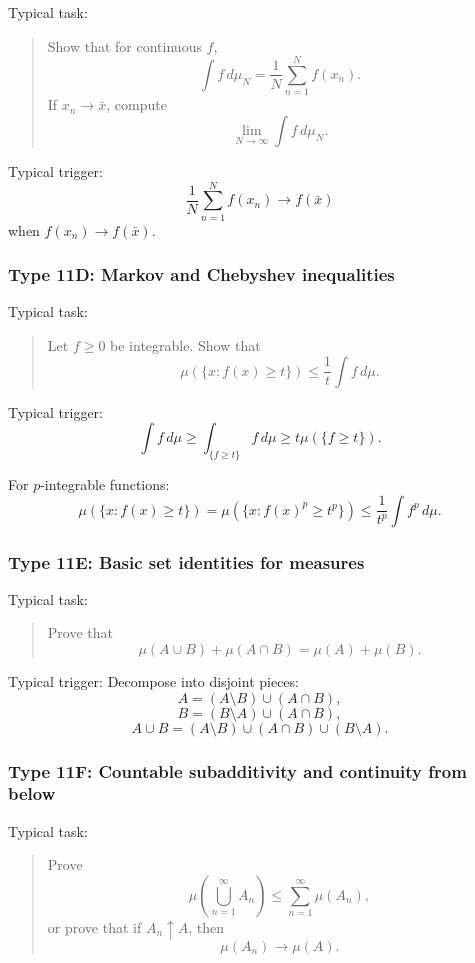 Typical task:
\begin{quote}
    Show that for continuous $f$,
    \[
        \int f\,d\mu_N
        =
        \frac1N\sum_{n=1}^N f(x_n).
    \]
    If $x_n\to \bar x$, compute
    \[
        \lim_{N\to\infty}\int f\,d\mu_N.
    \]
\end{quote}

Typical trigger:
\[
    \frac1N\sum_{n=1}^N f(x_n)\to f(\bar x)
\]
when $f(x_n)\to f(\bar x)$.

\subsubsection*{Type 11D: Markov and Chebyshev inequalities}

Typical task:
\begin{quote}
    Let $f\geq 0$ be integrable. Show that
    \[
        \mu(\{x:f(x)\geq t\})
        \leq
        \frac1t\int f\,d\mu.
    \]
\end{quote}

Typical trigger:
\[
    \int f\,d\mu
    \geq
    \int_{\{f\geq t\}} f\,d\mu
    \geq
    t\mu(\{f\geq t\}).
\]

For $p$-integrable functions:
\[
    \mu(\{x:f(x)\geq t\})
    =
    \mu(\{x:f(x)^p\geq t^p\})
    \leq
    \frac1{t^p}\int f^p\,d\mu.
\]

\subsubsection*{Type 11E: Basic set identities for measures}

Typical task:
\begin{quote}
    Prove that
    \[
        \mu(A\cup B)+\mu(A\cap B)=\mu(A)+\mu(B).
    \]
\end{quote}

Typical trigger: Decompose into disjoint pieces:
\[
    A=(A\setminus B)\cup(A\cap B),
\]
\[
    B=(B\setminus A)\cup(A\cap B),
\]
\[
    A\cup B=(A\setminus B)\cup(A\cap B)\cup(B\setminus A).
\]

\subsubsection*{Type 11F: Countable subadditivity and continuity from below}

Typical task:
\begin{quote}
    Prove
    \[
        \mu\left(\bigcup_{n=1}^\infty A_n\right)
        \leq
        \sum_{n=1}^\infty \mu(A_n),
    \]
    or prove that if $A_n\uparrow A$, then
    \[
        \mu(A_n)\to \mu(A).
    \]
\end{quote}

